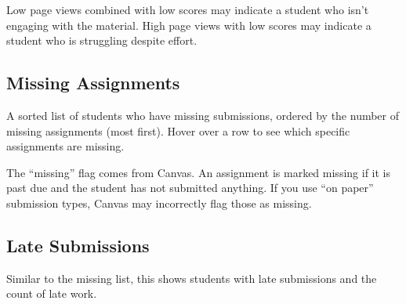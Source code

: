 \documentclass[12pt,letterpaper]{article}
\begin{document}
\begin{center}
\end{center}

\begin{tipbox}
Low page views combined with low scores may indicate a student who isn't engaging with the material. High page views with low scores may indicate a student who is struggling despite effort.
\end{tipbox}

\subsection{Missing Assignments}

A sorted list of students who have missing submissions, ordered by the number of missing assignments (most first). Hover over a row to see which specific assignments are missing.

\begin{warnbox}
The ``missing'' flag comes from Canvas. An assignment is marked missing if it is past due and the student has not submitted anything. If you use ``on paper'' submission types, Canvas may incorrectly flag those as missing.
\end{warnbox}

\subsection{Late Submissions}

Similar to the missing list, this shows students with late submissions and the count of late work.
\end{document}
